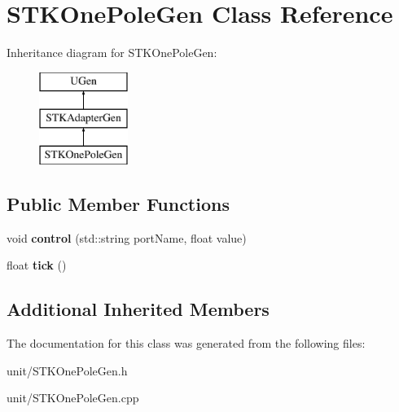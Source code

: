 \hypertarget{classSTKOnePoleGen}{}\section{S\+T\+K\+One\+Pole\+Gen Class Reference}
\label{classSTKOnePoleGen}
Inheritance diagram for S\+T\+K\+One\+Pole\+Gen\+:\begin{figure}[H]
\begin{center}
\leavevmode
\includegraphics[height=3.000000cm]{classSTKOnePoleGen}
\end{center}
\end{figure}
\subsection*{Public Member Functions}
\begin{DoxyCompactItemize}
\item 
void {\bfseries control} (std\+::string port\+Name, float value)\hypertarget{classSTKOnePoleGen_abafc7a64770438cbde61518a7cf2d94b}{}\label{classSTKOnePoleGen_abafc7a64770438cbde61518a7cf2d94b}

\item 
float {\bfseries tick} ()\hypertarget{classSTKOnePoleGen_a3bc702fbc334d94eebd409755d1d74e8}{}\label{classSTKOnePoleGen_a3bc702fbc334d94eebd409755d1d74e8}

\end{DoxyCompactItemize}
\subsection*{Additional Inherited Members}


The documentation for this class was generated from the following files\+:\begin{DoxyCompactItemize}
\item 
unit/S\+T\+K\+One\+Pole\+Gen.\+h\item 
unit/S\+T\+K\+One\+Pole\+Gen.\+cpp\end{DoxyCompactItemize}
